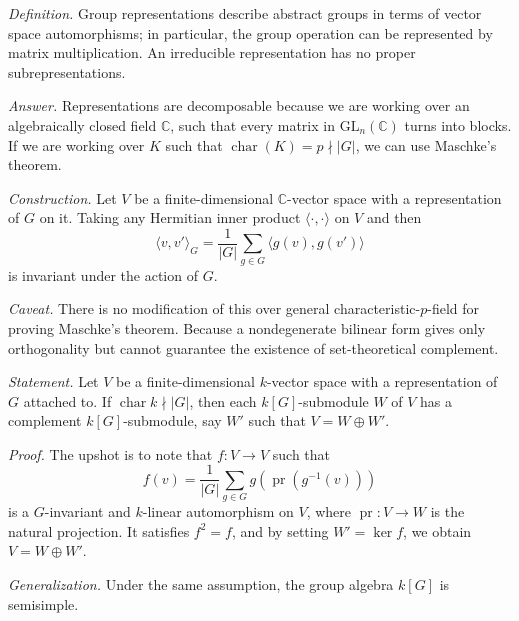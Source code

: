 \documentclass{mathproblems}
\newcommand\C{\mathbb{C}}
\newcommand\GL{\mathrm{GL}}
\begin{document}
\begin{questions}


\textit{Definition.} Group representations describe abstract groups in terms of vector space automorphisms; in particular, the group operation can be represented by matrix multiplication. An irreducible representation has no proper subrepresentations.

\textit{Answer.} Representations are decomposable because we are working over an algebraically closed field $\C$, such that every matrix in $\GL_n(\C)$ turns into blocks. If we are working over $K$ such that $\operatorname{char}(K)=p\nmid |G|$, we can use Maschke's theorem.

\textit{Construction.} Let $V$ be a finite-dimensional $\C$-vector space with a representation of $G$ on it. Taking any Hermitian inner product $\langle \cdot, \cdot \rangle$ on $V$ and then
$$
\langle v, v' \rangle_G=\frac{1}{|G|}\sum_{g\in G} \langle g(v), g(v') \rangle
$$
is invariant under the action of $G$.

{\color{red}
\textit{Caveat.} There is no modification of this over general characteristic-$p$-field for proving Maschke's theorem. Because a nondegenerate bilinear form gives only orthogonality but cannot guarantee the existence of set-theoretical complement.
}


\textit{Statement.} Let $V$ be a finite-dimensional $k$-vector space with a representation of $G$ attached to. If $\operatorname{char}k\nmid |G|$, then each $k[G]$-submodule $W$ of $V$ has a complement $k[G]$-submodule, say $W'$ such that $V=W\oplus W'$.

\textit{Proof.} The upshot is to note that $f: V\to V$ such that
$$
f(v)=\frac{1}{|G|}\sum_{g\in G} g(\operatorname{pr}(g^{-1}(v)))
$$
is a $G$-invariant and $k$-linear automorphism on $V$, where $\operatorname{pr}: V\to W$ is the natural projection. It satisfies $f^2=f$, and by setting $W'=\ker f$, we obtain $V=W\oplus W'$.

{\color{violet}
\textit{Generalization.} Under the same assumption, the group algebra $k[G]$ is semisimple.}


\end{questions}
\end{document}
